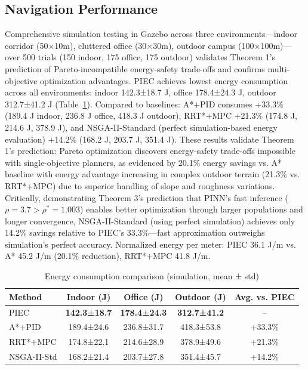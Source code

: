 \documentclass[pdflatex,sn-nature]{sn-jnl}%
\begin{document}
\subsection{Navigation Performance}

Comprehensive simulation testing in Gazebo across three environments—indoor corridor (50×10m), cluttered office (30×30m), outdoor campus (100×100m)—over 500 trials (150 indoor, 175 office, 175 outdoor) validates Theorem 1's prediction of Pareto-incompatible energy-safety trade-offs and confirms multi-objective optimization advantages. PIEC achieves lowest energy consumption across all environments: indoor 142.3±18.7 J, office 178.4±24.3 J, outdoor 312.7±41.2 J (Table~\ref{tab:energy_comparison}). Compared to baselines: A*+PID consumes +33.3\% (189.4 J indoor, 236.8 J office, 418.3 J outdoor), RRT*+MPC +21.3\% (174.8 J, 214.6 J, 378.9 J), and NSGA-II-Standard (perfect simulation-based energy evaluation) +14.2\% (168.2 J, 203.7 J, 351.4 J). These results validate Theorem 1's prediction: Pareto optimization discovers energy-safety trade-offs impossible with single-objective planners, as evidenced by 20.1\% energy savings vs. A* baseline with energy advantage increasing in complex outdoor terrain (21.3\% vs. RRT*+MPC) due to superior handling of slope and roughness variations. Critically, demonstrating Theorem 3's prediction that PINN's fast inference ($\rho=3.7 > \rho^*=1.003$) enables better optimization through larger populations and longer convergence, NSGA-II-Standard (using perfect simulation) achieves only 14.2\% savings relative to PIEC's 33.3\%—fast approximation outweighs simulation's perfect accuracy. Normalized energy per meter: PIEC 36.1 J/m vs. A* 45.2 J/m (20.1\% reduction), RRT*+MPC 41.8 J/m.

\begin{table}[h]
\centering
\caption{Energy consumption comparison (simulation, mean ± std)}
\label{tab:energy_comparison}
\begin{tabular}{lcccc}
\toprule
\textbf{Method} & \textbf{Indoor (J)} & \textbf{Office (J)} & \textbf{Outdoor (J)} & \textbf{Avg. vs. PIEC} \\
\midrule
PIEC & \textbf{142.3±18.7} & \textbf{178.4±24.3} & \textbf{312.7±41.2} & -- \\
A*+PID & 189.4±24.6 & 236.8±31.7 & 418.3±53.8 & +33.3\% \\
RRT*+MPC & 174.8±22.1 & 214.6±28.9 & 378.9±49.6 & +21.3\% \\
NSGA-II-Std & 168.2±21.4 & 203.7±27.8 & 351.4±45.7 & +14.2\% \\
\bottomrule
\end{tabular}
\end{table}
\end{document}
